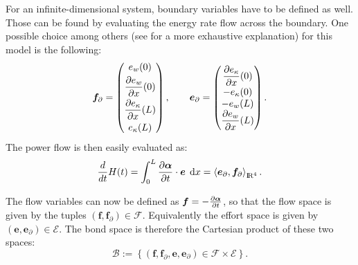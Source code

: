 \documentclass[preprint,12pt]{elsarticle}
\begin{document}
For an infinite-dimensional system, boundary variables have to be defined as well. Those can be found by evaluating the energy rate flow across the boundary. One possible choice among others (see \cite{articleFlavio} for a more exhaustive explanation) for this model is the following:
\begin{equation}
\label{eq:BoundPortEB}
\bm{f}_{\partial} = 
\begin{pmatrix}
e_w(0) \vspace{3pt} \\
\displaystyle \diffp{e_{w}}{x}(0) \vspace{3pt}\\
\displaystyle \diffp{e_{\kappa}}{x}(L) \vspace{3pt}\\
e_{\kappa}(L) \\
\end{pmatrix}, \qquad
\bm{e}_{\partial} = 
\begin{pmatrix}
\displaystyle \diffp{e_{\kappa}}{x}(0) \vspace{1pt}\\
-e_{\kappa}(0) \\
-e_w(L) \\
\displaystyle \diffp{e_{w}}{x}(L)\\
\end{pmatrix}.
\end{equation}
The power flow is then easily evaluated as:
\begin{equation}
\frac{d}{dt} H(t) = \int_{0}^{L} \diffp{\bm{\alpha}}{t} \cdot \bm{e} \, \d{x} = \left\langle \bm{e}_{\partial}, \bm{f}_{\partial} \right\rangle_{{\rm I\!R}^4}.
\end{equation}

The flow variables can now be defined as $\bm{f} = - \diffp{\bm{\alpha}}{t}$, so that the flow space is given by the tuples
$(\bm{f},\bm{f}_{\partial}) \in \mathcal{F}$. Equivalently the effort space is given by $(\bm{e},\bm{e}_{\partial}) \in \mathcal{E}$. The bond space is therefore the Cartesian product of these two spaces:
\begin{equation}
\label{eq:BondEB}
\mathcal{B} := \left\{(\bm{f},\bm{f}_{\partial},\bm{e},\bm{e}_{\partial}) \in \mathcal{F} \times \mathcal{E} \right\}.
\end{equation}
\end{document}
